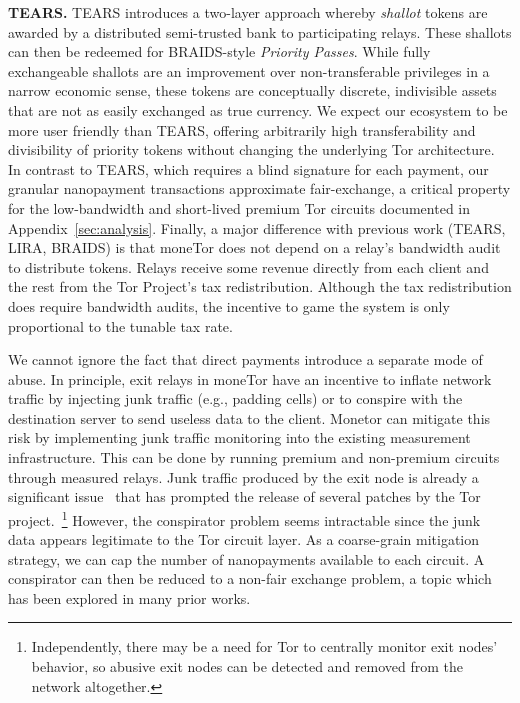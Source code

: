 \medskip\noindent\textbf{TEARS.}
TEARS introduces a two-layer approach whereby \emph{shallot} tokens are awarded by a distributed semi-trusted bank to participating relays.
These shallots can then be redeemed for BRAIDS-style \emph{Priority Passes}.
While fully exchangeable shallots are an improvement over non-transferable privileges in a narrow economic sense, these tokens are conceptually discrete, indivisible assets that are not as easily exchanged as true currency.
We expect our ecosystem to be more user friendly than TEARS, offering arbitrarily high transferability and divisibility of priority tokens without changing the underlying Tor architecture.
In contrast to TEARS, which requires a blind signature for each payment, our granular nanopayment transactions approximate fair-exchange, a critical property for the low-bandwidth and short-lived premium Tor circuits documented in Appendix~\ref{sec:analysis}.
Finally, a major difference with previous work (TEARS, LIRA, BRAIDS) is that moneTor does not depend on a relay's bandwidth audit to distribute tokens.
Relays receive some revenue directly from each client and the rest from the Tor Project's tax redistribution.
Although the tax redistribution does require bandwidth audits, the incentive to game the system is only proportional to the tunable tax rate.

We cannot ignore the fact that direct payments introduce a separate mode of abuse.
In principle, exit relays in moneTor have an incentive to inflate network traffic by injecting junk traffic (e.g., padding cells) or to conspire with the destination server to send useless data to the client.
Monetor can mitigate this risk by implementing junk traffic monitoring into the existing measurement infrastructure.
This can be done by running premium and non-premium circuits through measured relays.
Junk traffic produced by the exit node is already a significant issue~\cite{rochet2018dropping} that has prompted the release of several patches by the Tor project.~\footnote{Independently, there may be a need for Tor to centrally monitor exit nodes' behavior, so abusive exit nodes can be detected and removed from the network altogether.}
However, the conspirator problem seems intractable since the junk data appears legitimate to the Tor circuit layer.
As a coarse-grain mitigation strategy, we can cap the number of nanopayments available to each circuit.
A conspirator can then be reduced to a non-fair exchange problem, a topic which has been explored in many prior works.
